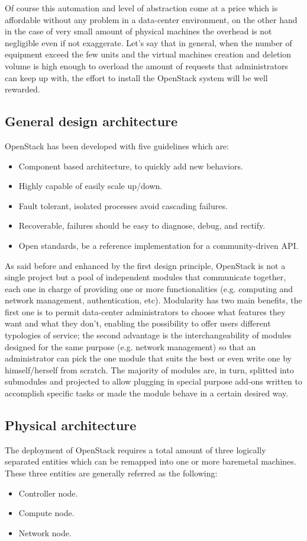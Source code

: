 Of course this automation and level of abstraction come at a price which is affordable without any problem in a data-center environment, on the other hand in the case of very small amount of physical machines the overhead is not negligible even if not exaggerate.
Let's say that in general, when the number of equipment exceed the few units and the virtual machines creation and deletion volume is high enough to overload the amount of requests that administrators can keep up with, the effort to install the OpenStack system will be well rewarded.

\subsection{General design architecture}
OpenStack has been developed with five guidelines which are:
\begin{itemize}
    \item Component based architecture, to quickly add new behaviors.
    \item Highly capable of easily scale up/down.
    \item Fault tolerant, isolated processes avoid cascading failures.
    \item Recoverable, failures should be easy to diagnose, debug, and rectify.
    \item Open standards, be a reference implementation for a community-driven API.
\end{itemize}
As said before and enhanced by the first design principle, OpenStack is not a single project but a pool of independent modules that communicate together, each one in charge of providing one or more functionalities (e.g. computing and network management, authentication, etc).
Modularity has two main benefits, the first one is to permit data-center administrators to choose what features they want and what they don't, enabling the possibility to offer users different typologies of service; the second advantage is the interchangeability of modules designed for the same purpose (e.g. network management) so that an administrator can pick the one module that suits the best or even write one by himself/herself from scratch.
The majority of modules are, in turn, splitted into submodules and projected to allow plugging in special purpose add-ons written to accomplish specific tasks or made the module behave in a certain desired way.
\subsection{Physical architecture}
The deployment of OpenStack requires a total amount of three logically separated entities which can be remapped into one or more baremetal machines.
These three entities are generally referred as the following:
\begin{itemize}
    \item Controller node.
    \item Compute node.
    \item Network node.
\end{itemize}

